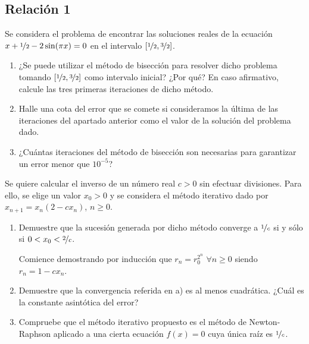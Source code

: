 \subsection{Relación 1}
\setcounter{ejercicio}{0}

\begin{ejercicio}\label{ej:1.1.1}
    Se considera el problema de encontrar las soluciones reales de la ecuación $x + \nicefrac{1}{2} - 2\sin(\pi x) = 0$ en el intervalo $\left[\nicefrac{1}{2},\nicefrac{3}{2}\right]$.
    \begin{enumerate}
        \item ¿Se puede utilizar el método de bisección para resolver dicho problema tomando $\left[\nicefrac{1}{2},\nicefrac{3}{2}\right]$ como intervalo inicial? ¿Por qué? En caso afirmativo, calcule las tres primeras iteraciones de dicho método.
        \item Halle una cota del error que se comete si consideramos la última de las iteraciones del apartado anterior como el valor de la solución del problema dado.
        \item ¿Cuántas iteraciones del método de bisección son necesarias para garantizar un error menor que $10^{-5}$?
    \end{enumerate}
\end{ejercicio}

\begin{ejercicio}\label{ej:1.1.2}
    Se quiere calcular el inverso de un número real $c > 0$ sin efectuar divisiones. Para ello, se elige un valor $x_0 > 0$ y se considera el método iterativo dado por $x_{n+1} = x_n(2 - cx_n)$, $n \geq 0$.
    \begin{enumerate}
        \item Demuestre que la sucesión generada por dicho método converge a $\nicefrac{1}{c}$ si y sólo si $0 < x_0 < \nicefrac{2}{c}$.
        \begin{observacion}
            Comience demostrando por inducción que $r_n = r^{2^n}_0$ $\forall n \geq 0$ siendo $r_n = 1 - cx_n$.
        \end{observacion} 
        \item Demuestre que la convergencia referida en a) es al menos cuadrática. ¿Cuál es la constante asintótica del error?
        \item Compruebe que el método iterativo propuesto es el método de Newton-Raphson aplicado a una cierta ecuación $f(x) = 0$ cuya única raíz es $\nicefrac{1}{c}$.
    \end{enumerate}
\end{ejercicio}



